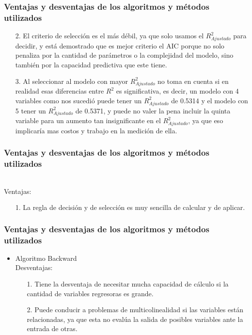 \documentclass[12pt]{beamer}
\begin{document}
\begin{frame}
\frametitle{Ventajas y desventajas de los algoritmos y métodos utilizados}
\begin{itemize}
\item[2.] El criterio de selección es el más débil, ya que solo usamos el $R^2_{Ajustado}$ para decidir, y está demostrado que es mejor criterio el AIC porque no solo penaliza por la cantidad de parámetros o la complejidad del modelo, sino también por la capacidad predictiva que este tiene.
\item[3.] Al seleccionar al modelo con mayor $R^2_{Ajustado}$ no toma en cuenta si en realidad esas diferencias entre $R^2$ es significativa, es decir, un modelo con 4 variables como nos sucedió puede tener un $R^2_{Ajustado}$ de 0.5314 y el modelo con 5 tener un $R^2_{Ajustado}$ de 0.5371, y puede no valer la pena incluir la quinta variable para un aumento tan insignificante en el $R^2_{Ajustado}$, ya que eso implicaría mas costos y trabajo en la medición de ella.   
\end{itemize}
\end{frame}

\begin{frame}
\frametitle{Ventajas y desventajas de los algoritmos y métodos utilizados}
~\\ Ventajas:
\begin{itemize}
\item[1.] La regla de decisión y de selección es muy sencilla de calcular y de aplicar.
\end{itemize}
\end{frame}

\begin{frame}
\frametitle{Ventajas y desventajas de los algoritmos y métodos utilizados}
\begin{itemize}
\item Algoritmo Backward
~\\ Desventajas:
\begin{itemize}
\item[1.] Tiene la desventaja de necesitar mucha capacidad de cálculo si la cantidad de variables regresoras es grande.
\item[2.] Puede conducir a problemas de multicolinealidad si las variables están relacionadas, ya que esta no evalúa la salida de posibles variables ante la entrada de otras.
\end{itemize}
\end{itemize}
\end{frame}
\end{document}
